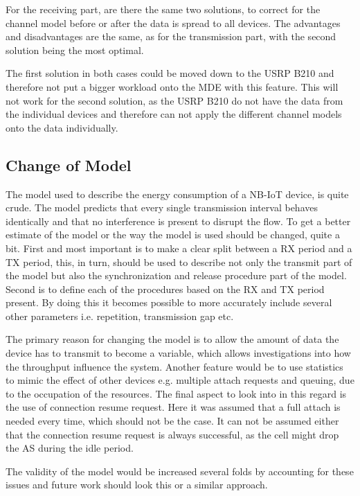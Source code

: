 For the receiving part, are there the same two solutions, to correct for the channel model before or after the data is spread to all devices. The advantages and disadvantages are the same, as for the transmission part, with the second solution being the most optimal.

The first solution in both cases could be moved down to the USRP B210 and therefore not put a bigger workload onto the MDE with this feature. This will not work for the second solution, as the USRP B210 do not have the data from the individual devices and therefore can not apply the different channel models onto the data individually.

\subsection{Change of Model}
The model used to describe the energy consumption of a NB-IoT device, is quite crude. The model predicts that every single transmission interval behaves identically and that no interference is present to disrupt the flow. To get a better estimate of the model or the way the model is used should be changed, quite a bit. First and most important is to make a clear split between a RX period and a TX period, this, in turn, should be used to describe not only the transmit part of the model but also the synchronization and release procedure part of the model. Second is to define each of the procedures based on the RX and TX period present. By doing this it becomes possible to more accurately include several other parameters i.e. repetition, transmission gap etc. 

The primary reason for changing the model is to allow the amount of data the device has to transmit to become a variable, which allows investigations into how the throughput influence the system. Another feature would be to use statistics to mimic the effect of other devices e.g. multiple attach requests and queuing, due to the occupation of the resources. The final aspect to look into in this regard is the use of connection resume request. Here it was assumed that a full attach is needed every time, which should not be the case. It can not be assumed either that the connection resume request is always successful, as the cell might drop the AS during the idle period.

The validity of the model would be increased several folds by accounting for these issues and future work should look this or a similar approach.

